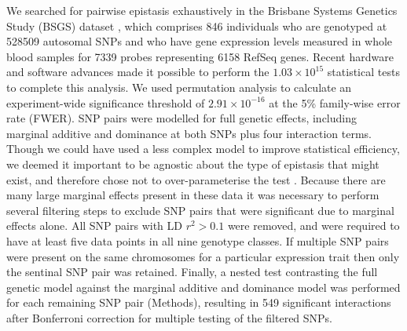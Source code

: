 \documentclass{article}
\begin{document}
We searched for pairwise epistasis exhaustively in the Brisbane Systems Genetics Study (BSGS) dataset \cite{Powell2012}, which comprises 846 individuals who are genotyped at 528509 autosomal SNPs and who have gene expression levels measured in whole blood samples for 7339 probes representing 6158 RefSeq genes. Recent hardware and software \cite{Hemani2011} advances made it possible to perform the $1.03 \times 10^{15}$ statistical tests to complete this analysis. We used permutation analysis \cite{Churchill1994a} to calculate an experiment-wide significance threshold of $2.91 \times 10^{-16}$ at the 5\% family-wise error rate (FWER). SNP pairs were modelled for full genetic effects, including marginal additive and dominance at both SNPs plus four interaction terms. Though we could have used a less complex model to improve statistical efficiency, we deemed it important to be agnostic about the type of epistasis that might exist, and therefore chose not to over-parameterise the test \cite{Marchini2005, Hemani2013}. Because there are many large marginal effects present in these data it was necessary to perform several filtering steps to exclude SNP pairs that were significant due to marginal effects alone. All SNP pairs with LD $r^2 > 0.1$ were removed, and were required to have at least five data points in all nine genotype classes. If multiple SNP pairs were present on the same chromosomes for a particular expression trait then only the sentinal SNP pair was retained. Finally, a nested test contrasting the full genetic model against the marginal additive and dominance model was performed for each remaining SNP pair (Methods), resulting in 549 significant interactions after Bonferroni correction for multiple testing of the filtered SNPs.
\end{document}
